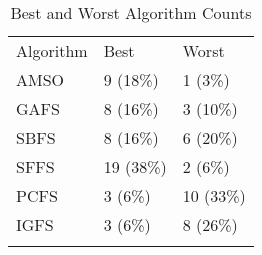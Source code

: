 \begin{table}
\caption{Best and Worst Algorithm Counts}
\label{tbl:best:worst:count}
\begin{tabular}{lll}
\noalign{\smallskip}\hline\noalign{\smallskip}
Algorithm&Best&Worst\\
\noalign{\smallskip}\hline
AMSO&9 (18\%)&1 (3\%)\\
GAFS&8 (16\%)&3 (10\%)\\
SBFS&8 (16\%)&6 (20\%)\\
SFFS&19 (38\%)&2 (6\%)\\
PCFS&3 (6\%)&10 (33\%)\\
IGFS&3 (6\%)&8 (26\%)\\
\noalign{\smallskip}\hline
\end{tabular}
\end{table}
